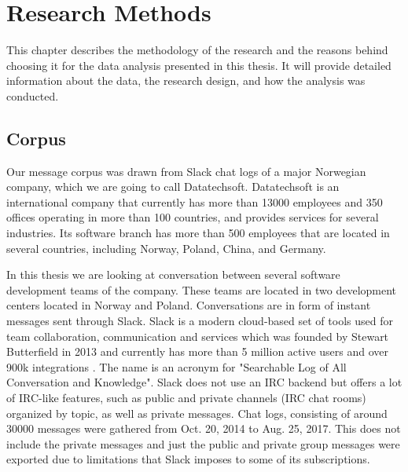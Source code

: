 \chapter{Research Methods}
This chapter describes the methodology of the research and the reasons behind choosing it for the data analysis presented in this thesis. It will provide detailed information about the data, the research design, and how the analysis was conducted.


\section{Corpus}
Our message corpus was drawn from Slack chat logs of a major Norwegian company, which we are going to call Datatechsoft. Datatechsoft is an international company that currently has more than 13000 employees and 350 offices operating in more than 100 countries, and provides services for several industries. Its software branch has more than 500 employees that are located in several countries, including Norway, Poland, China, and Germany.

In this thesis we are looking at conversation between several software development teams of the company. These teams are located in two development centers located in Norway and Poland. Conversations are in form of instant messages sent through Slack. Slack is a modern cloud-based set of tools used for team collaboration, communication and services which was founded by Stewart Butterfield in 2013 and currently has more than 5 million active users and over 900k integrations \citep{Lin2016WhySlack}. The name is an acronym for "Searchable Log of All Conversation and Knowledge". Slack does not use an IRC backend but offers a lot of IRC-like features, such as public and private channels (IRC chat rooms) organized by topic, as well as private messages. 
Chat logs, consisting of around 30000 messages were gathered from Oct. 20, 2014 to Aug. 25, 2017. This does not include the private messages and just the public and private group messages were exported due to limitations that Slack imposes to some of its subscriptions.

